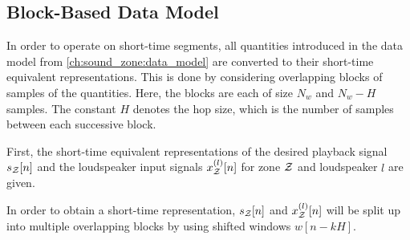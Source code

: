 \subsection{Block-Based Data Model}


In order to operate on short-time segments, all quantities introduced in the data model from \autoref{ch:sound_zone:data_model}
are converted to their short-time equivalent representations.
This is done by considering overlapping blocks of samples of the quantities.
Here, the blocks are each of size $N_w$ and $N_w - H$ samples.
The constant $H$ denotes the hop size, which is the number of samples between each successive block.

First, the short-time equivalent representations of the desired playback signal $s_{\mathcal{Z}}[n]$ and the loudspeaker input
signals $x^{(l)}_{\mathcal{Z}}[n]$ for zone $\mathcal{Z}$ and loudspeaker $l$ are given.  

In order to obtain a short-time representation, $s_{\mathcal{Z}}[n]$ and $x^{(l)}_{\mathcal{Z}}[n]$ will be split up into multiple overlapping blocks by using shifted windows $w[n - kH]$. 

